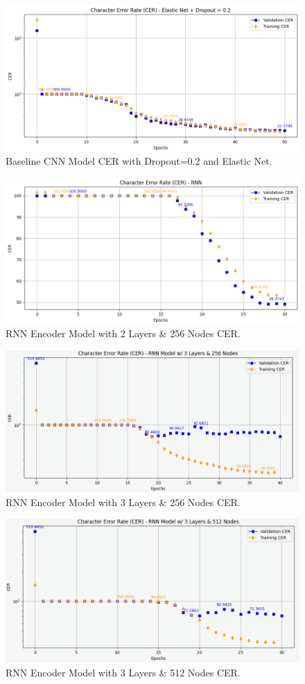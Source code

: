 \documentclass{article}
\begin{document}
\begin{figure}[ht]
  \centering
  \includegraphics[width=0.8\linewidth]{ElasticNet+Dropout0.2_CER.png} 
  \caption{Baseline CNN Model CER with Dropout=0.2 and Elastic Net.}
  \label{fig:dropout0.2+elasticnet_cer}
\end{figure}

\begin{figure}[ht]
  \centering
  \includegraphics[width=0.8\linewidth]{RNN_CER.png} 
  \caption{RNN Encoder Model with 2 Layers \& 256 Nodes CER.}
  \label{fig:RNN_cer}
\end{figure}

\begin{figure}[ht]
  \centering
  \includegraphics[width=0.8\linewidth]{RNN_3_256_CER.png} 
  \caption{RNN Encoder Model with 3 Layers \& 256 Nodes CER.}
  \label{fig:RNN_3_256_cer}
\end{figure}

\begin{figure}[ht]
  \centering
  \includegraphics[width=0.8\linewidth]{RNN_3_512_CER.png} 
  \caption{RNN Encoder Model with 3 Layers \& 512 Nodes CER.}
  \label{fig:RNN_3_512_cer}
\end{figure}
    
\end{document}
